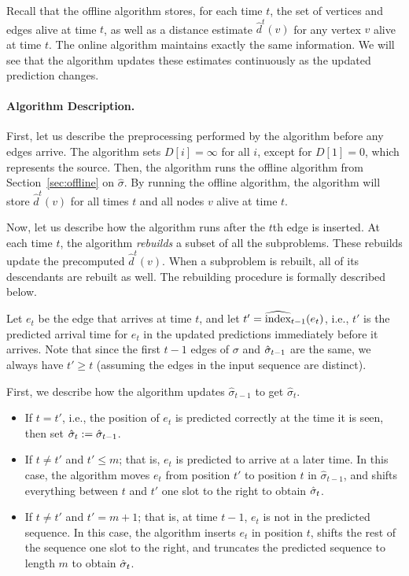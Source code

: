 Recall that the offline algorithm stores, for each time $t$, the set of vertices and edges alive at time $t$, as well as a distance estimate $\hat{d}^{t}(v)$ for any vertex $v$ alive at time $t$.  
The online algorithm maintains exactly the same information.  
We will see that the algorithm updates these estimates continuously as the updated prediction changes.

\paragraph{Algorithm Description.}

First, let us describe the preprocessing performed by the algorithm before any edges arrive.
The algorithm sets $D[i] = \infty$ for all $i$, except for $D[1] = 0$, which represents the source. 
Then, the algorithm runs the offline algorithm from Section~\ref{sec:offline} on $\hat{\sigma}$.   
By running the offline algorithm, the algorithm will store $\hat{d}^t(v)$ for all times $t$ and all nodes $v$ alive at time $t$.   

Now, let us describe how the algorithm runs after the $t$th edge is inserted.
At each time $t$, the algorithm \emph{rebuilds} a subset of all the subproblems.  These rebuilds update the precomputed $\hat{d}^t(v)$. When a subproblem is rebuilt, all of its descendants are rebuilt as well.  The rebuilding procedure is formally described below. 

Let $e_t$ be the edge that arrives at time $t$, and let $t'= \widehat{\text{index}}_{t-1}(e_t)$, i.e., $t'$ is the predicted arrival time for $e_t$ in the updated predictions immediately before it arrives. 
Note that since the first $t-1$ edges of $\sigma$ and $\hat{\sigma}_{t-1}$ are the same, we always have $t' \geq t$ (assuming the edges in the input sequence are distinct).

First, we describe how the algorithm updates $\hat{\sigma}_{t-1}$ to get $\hat{\sigma}_t$.
\begin{itemize}
    \item If $t = t'$, i.e., the position of $e_t$ is predicted correctly at the time it is seen, then set $\hat{\sigma}_t := \hat{\sigma}_{t-1}$.
    \item If $t \neq t'$ and $t' \leq m$; that is, $e_t$ is predicted to arrive at a later time. In this case, the algorithm moves $e_t$ from position $t'$ to position $t$ in $\hat{\sigma}_{t-1}$, and shifts everything between $t$ and $t'$ one slot to the right to obtain $\hat{\sigma}_t$. 
    \item If $t \neq t'$ and $t' = m + 1$; that is, at time $t-1$, $e_t$ is not in the predicted sequence.  In this case, the algorithm inserts $e_t$ in position $t$, shifts the rest of the sequence one slot to the right, and truncates the predicted sequence to length $m$ to obtain $\hat{\sigma}_t$. 
\end{itemize}

